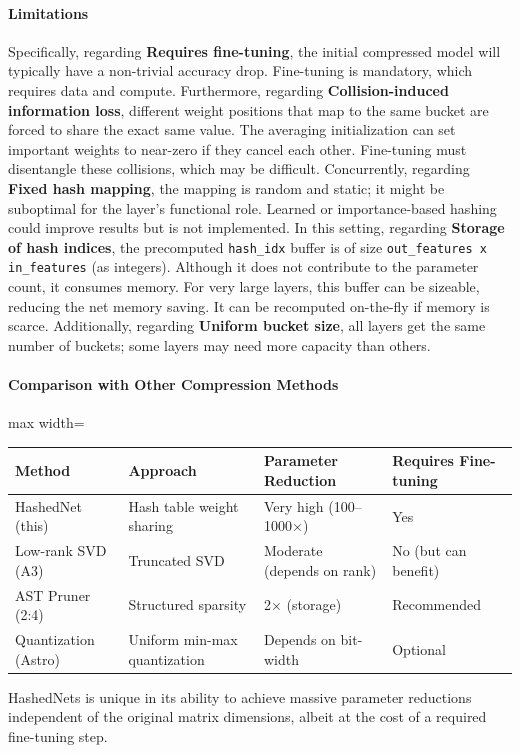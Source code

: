 \paragraph{Limitations}

Specifically, regarding \textbf{Requires fine-tuning}, the initial compressed model will typically have a non-trivial accuracy drop. Fine-tuning is mandatory, which requires data and compute. Furthermore, regarding \textbf{Collision-induced information loss}, different weight positions that map to the same bucket are forced to share the exact same value. The averaging initialization can set important weights to near-zero if they cancel each other. Fine-tuning must disentangle these collisions, which may be difficult. Concurrently, regarding \textbf{Fixed hash mapping}, the mapping is random and static; it might be suboptimal for the layer's functional role. Learned or importance-based hashing could improve results but is not implemented. In this setting, regarding \textbf{Storage of hash indices}, the precomputed \texttt{hash\_idx} buffer is of size \texttt{out\_features x in\_features} (as integers). Although it does not contribute to the parameter count, it consumes memory. For very large layers, this buffer can be sizeable, reducing the net memory saving. It can be recomputed on-the-fly if memory is scarce. Additionally, regarding \textbf{Uniform bucket size}, all layers get the same number of buckets; some layers may need more capacity than others.


\paragraph{Comparison with Other Compression Methods}

\begin{center}
\begin{adjustbox}{max width=\columnwidth}
\renewcommand{\arraystretch}{1.2}
\begin{tabular}{llll}
\toprule
Method & Approach & Parameter Reduction & Requires Fine-tuning \\
\midrule
HashedNet (this) & Hash table weight sharing & Very high (100--1000$\times$) & Yes \\
Low-rank SVD (A3) & Truncated SVD & Moderate (depends on rank) & No (but can benefit) \\
AST Pruner (2:4) & Structured sparsity & 2$\times$ (storage) & Recommended \\
Quantization (Astro) & Uniform min-max quantization & Depends on bit-width & Optional \\

\bottomrule
\end{tabular}
\end{adjustbox}
\end{center}
HashedNets is unique in its ability to achieve massive parameter reductions independent of the original matrix dimensions, albeit at the cost of a required fine-tuning step.


